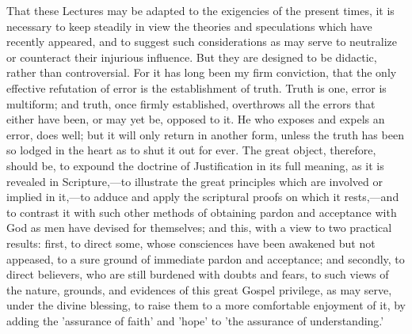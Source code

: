 \documentclass[
]{book}
\begin{document}
That these Lectures may be adapted to the exigencies of the present times, it is necessary to keep steadily in view the theories and speculations which have recently appeared, and to suggest such considerations as may serve to neutralize or counteract their injurious influence. But they are designed to be didactic, rather than controversial. For it has long been my firm conviction, that the only effective refutation of error is the establishment of truth. Truth is one, error is multiform; and truth, once firmly established, overthrows all the errors that either have been, or may yet be, opposed to it. He who exposes and expels an error, does well; but it will only return in another form, unless the truth has been so lodged in the heart as to shut it out for ever. The great object, therefore, should be, to expound the doctrine of Justification in its full meaning, as it is revealed in Scripture,---to illustrate the great principles which are involved or implied in it,---to adduce and apply the scriptural proofs on which it rests,---and to contrast it with such other methods of obtaining pardon and acceptance with God as men have devised for themselves; and this, with a view to two practical results: first, to direct some, whose consciences have been awakened but not appeased, to a sure ground of immediate pardon and acceptance; and secondly, to direct believers, who are still burdened with doubts and fears, to such views of the nature, grounds, and evidences of this great Gospel privilege, as may serve, under the divine blessing, to raise them to a more comfortable enjoyment of it, by adding the 'assurance of faith' and 'hope' to 'the assurance of understanding.'
\end{document}
